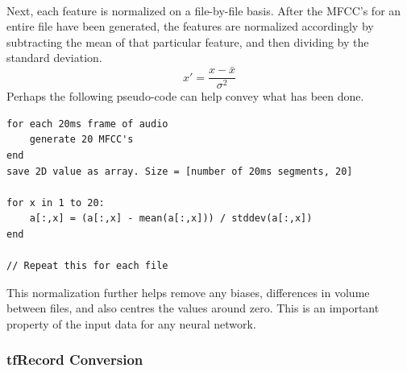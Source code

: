 \documentclass[a4paper,11pt,notitlepage]{article}
\begin{document}
\\
Next, each feature is normalized on a file-by-file basis. After the MFCC's for an entire file have been generated, the features are normalized accordingly by subtracting the mean of that particular feature, and then dividing by the standard deviation.
\begin{equation}
	x\prime = \frac{x - \bar{x}}{\sigma^2}
\end{equation}
Perhaps the following pseudo-code can help convey what has been done.
\begin{lstlisting}
for each 20ms frame of audio
    generate 20 MFCC's
end
save 2D value as array. Size = [number of 20ms segments, 20]

for x in 1 to 20:
    a[:,x] = (a[:,x] - mean(a[:,x])) / stddev(a[:,x])
end

// Repeat this for each file
\end{lstlisting}
This normalization further helps remove any biases, differences in volume between files, and also centres the values around zero. This is an important property of the input data for any neural network.\cite{lecun2012efficient}

\subsubsection{tfRecord Conversion}\label{section:tfRecord_conversion}
\end{document}
